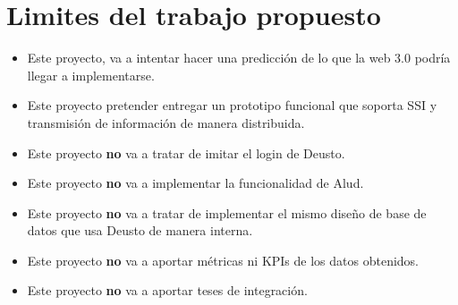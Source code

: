 \section*{Limites del trabajo propuesto}
\begin{itemize}
    \item Este proyecto, va a intentar hacer una predicción de lo que la web 3.0 podría llegar a implementarse.
    \item Este proyecto pretender entregar un prototipo funcional que soporta SSI y transmisión de información de manera distribuida.
    \item Este proyecto \textbf{no} va a tratar de imitar el login de Deusto.
    \item Este proyecto \textbf{no} va a implementar la funcionalidad de Alud. 
    \item Este proyecto \textbf{no} va a tratar de implementar el mismo diseño de base de datos que usa Deusto de manera interna.
    \item Este proyecto \textbf{no} va a aportar métricas ni KPIs de los datos obtenidos.
    \item Este proyecto \textbf{no} va a aportar teses de integración.
\end{itemize}

\newpage
\thispagestyle{empty}